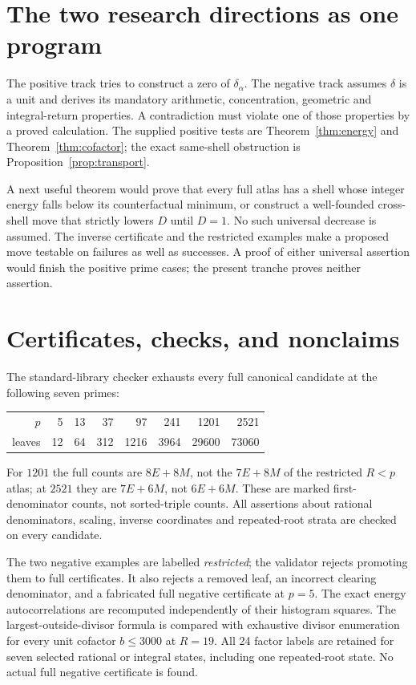 \documentclass[11pt]{article}
\theoremstyle{definition}\newtheorem{definition}[theorem]{Definition}
\theoremstyle{remark}\newtheorem{remark}[theorem]{Remark}
\begin{document}
\section{The two research directions as one program}
The positive track tries to construct a zero of $\delta_\alpha$. The negative
track assumes $\delta$ is a unit and derives its mandatory arithmetic,
concentration, geometric and integral-return properties. A contradiction
must violate one of those properties by a proved calculation.
The supplied positive tests are Theorem~\ref{thm:energy} and
Theorem~\ref{thm:cofactor}; the exact same-shell obstruction is
Proposition~\ref{prop:transport}.

A next useful theorem would prove that every full atlas has a shell whose
integer energy falls below its counterfactual minimum, or construct a
well-founded cross-shell move that strictly lowers $D$ until $D=1$.
No such universal decrease is assumed. The inverse certificate and the
restricted examples make a proposed move testable on failures as well as
successes. A proof of either universal assertion would finish the positive
prime cases; the present tranche proves neither assertion.

\section{Certificates, checks, and nonclaims}
The standard-library checker exhausts every full canonical candidate at
the following seven primes:
\begin{center}\begin{tabular}{r|rrrrrrr}
$p$&5&13&37&97&241&1201&2521\\
leaves&12&64&312&1216&3964&29600&73060
\end{tabular}\end{center}
For $1201$ the full counts are $8E+8M$, not the $7E+8M$ of the restricted
$R<p$ atlas; at $2521$ they are $7E+6M$, not $6E+6M$.
These are marked first-denominator counts, not sorted-triple counts.
All assertions about rational denominators, scaling, inverse coordinates
and repeated-root strata are checked on every candidate.

The two negative examples are labelled \emph{restricted}; the validator
rejects promoting them to full certificates. It also rejects a removed
leaf, an incorrect clearing denominator, and a fabricated full negative
certificate at $p=5$. The exact energy autocorrelations are recomputed
independently of their histogram squares. The largest-outside-divisor
formula is compared with exhaustive divisor enumeration for every unit
cofactor $b\le3000$ at $R=19$. All 24 factor labels are retained for seven
selected rational or integral states, including one repeated-root state.
No actual full negative certificate is found.
\end{document}
